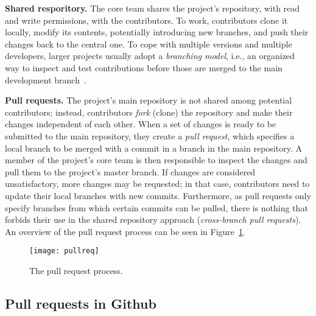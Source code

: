 \documentclass{sig-alternate}
\begin{document}
\textbf{Shared resporitory.}
    The core team shares the project's repository, with read and write
    permissions, with the contributors. To work, contributors clone it locally,
    modify its contents, potentially introducing new branches, and push their
    changes back to the central one. To cope with multiple versions and multiple
    developers, larger projects usually adopt a {\em branching model}, i.e., an
    organized way to inspect and test contributions before those are merged to
    the main development branch~\cite{Bird12}. 
    

\textbf{Pull requests.}
    The project's main repository is not shared among potential contributors;
    instead, contributors \emph{fork} (clone) the repository and make their
    changes independent of each other. When a set of changes is ready to be
    submitted to the main repository, they create a \emph{pull request}, which
    specifies a local branch to be merged with a commit in a branch in the main
    repository. A member of the project's core team is then responsible to
    inspect the changes and pull them to the project's master branch. If changes
    are considered unsatisfactory, more changes may be requested; in that case,
    contributors need to update their local branches with new commits.
    Furthermore, as pull requests only specify branches from which certain
    commits can be pulled, there is nothing that forbids their use in the shared
    repository approach (\emph{cross-branch pull requests}). An overview of the
    pull request process can be seen in Figure~\ref{fig:pullreq-process}.

    \begin{figure}[t]
      \begin{center}
        \texttt{[image: pullreq]}
      \end{center}
      \caption{The pull request process.}
      \label{fig:pullreq-process}
    \end{figure}

\subsection{Pull requests in Github}
\end{document}
